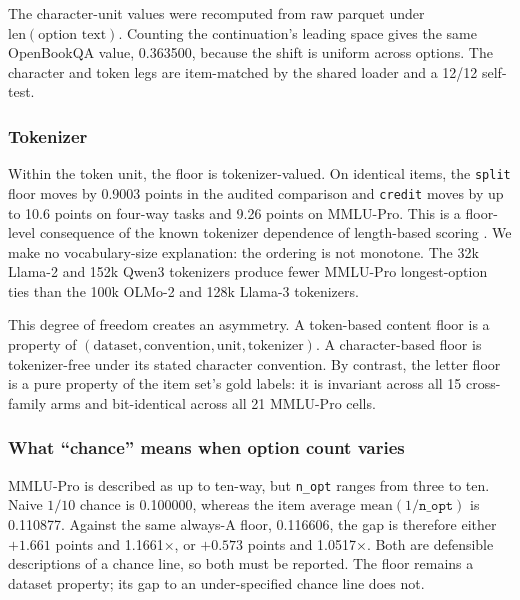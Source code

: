 The character-unit values were recomputed from raw parquet under $\mathrm{len}(\text{option text})$. Counting the continuation's leading space gives the same OpenBookQA value, 0.363500, because the shift is uniform across options. The character and token legs are item-matched by the shared loader and a 12/12 self-test.

\subsubsection{Tokenizer}

Within the token unit, the floor is tokenizer-valued. On identical items, the \texttt{split} floor moves by 0.9003 points in the audited comparison and \texttt{credit} moves by up to 10.6 points on four-way tasks and 9.26 points on MMLU-Pro. This is a floor-level consequence of the known tokenizer dependence of length-based scoring \citep{oostermeijer2026length}. We make no vocabulary-size explanation: the ordering is not monotone. The 32k Llama-2 and 152k Qwen3 tokenizers produce fewer MMLU-Pro longest-option ties than the 100k OLMo-2 and 128k Llama-3 tokenizers.

This degree of freedom creates an asymmetry. A token-based content floor is a property of $(\text{dataset},\text{convention},\text{unit},\text{tokenizer})$. A character-based floor is tokenizer-free under its stated character convention. By contrast, the letter floor is a pure property of the item set's gold labels: it is invariant across all 15 cross-family arms and bit-identical across all 21 MMLU-Pro cells.

\subsubsection{What ``chance'' means when option count varies}

MMLU-Pro is described as up to ten-way, but \texttt{n\_opt} ranges from three to ten. Naive $1/10$ chance is 0.100000, whereas the item average $\mathrm{mean}(1/\texttt{n\_opt})$ is 0.110877. Against the same always-A floor, 0.116606, the gap is therefore either $+1.661$ points and 1.1661$\times$, or $+0.573$ points and 1.0517$\times$. Both are defensible descriptions of a chance line, so both must be reported. The floor remains a dataset property; its gap to an under-specified chance line does not.




\FloatBarrier
